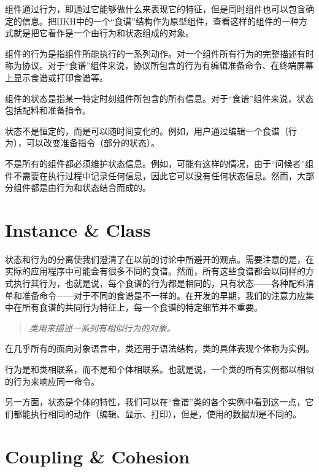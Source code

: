 组件通过行为，即通过它能够做什么来表现它的特征，但是同时组件也可以包含确定的信息。把IIKH中的一个“食谱”结构作为原型组件，查看这样的组件的一种方式就是把它看作是一个由行为和状态组成的对象。


\begin{compactitem}
\item 组件的行为是指组件所能执行的一系列动作。对一个组件所有行为的完整描述有时称为协议。对于“食谱”组件来说，协议所包含的行为有编辑准备命令、在终端屏幕上显示食谱或打印食谱等。

\item 组件的状态是指某一特定时刻组件所包含的所有信息。对于“食谱”组件来说，状态包括配料和准备指令。
\end{compactitem}

状态不是恒定的，而是可以随时间变化的。例如，用户通过编辑一个食谱（行为），可以改变准备指令（部分的状态）。

不是所有的组件都必须维护状态信息。例如，可能有这样的情况，由于“问候者”组件不需要在执行过程中记录任何信息，因此它可以没有任何状态信息。然而，大部分组件都是由行为和状态结合而成的。

\section{Instance \& Class}


状态和行为的分离使我们澄清了在以前的讨论中所避开的观点。需要注意的是，在实际的应用程序中可能会有很多不同的食谱。然而，所有这些食谱都会以同样的方式执行其行为，也就是说，每个食谱的行为都是相同的，只有状态——各种配料清单和准备命令——对于不同的食谱是不一样的。在开发的早期，我们的注意力应集中在所有食谱的共同行为特征上，每一个食谱的特定细节并不重要。

\begin{quote}
\textsl{类用来描述一系列有相似行为的对象。}
\end{quote}

在几乎所有的面向对象语言中，类还用于语法结构，类的具体表现个体称为实例。

行为是和类相联系，而不是和个体相联系。也就是说，一个类的所有实例都以相似的行为来响应同一命令。

另一方面，状态是个体的特性，我们可以在“食谱”类的各个实例中看到这一点，它们都能执行相同的动作（编辑、显示、打印），但是，使用的数据却是不同的。

\section{Coupling \& Cohesion}



